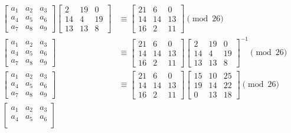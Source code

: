 \begin{Answer}
\begin{align*}
\begin{bmatrix}
      a_1 & a_2 & a_3 \\
      a_4 & a_5 & a_6 \\
      a_7 & a_8 & a_9
    \end{bmatrix} \begin{bmatrix}
         2 & 19 &  0\\
        14 &  4 & 19\\
        13 & 13 &  8
      \end{bmatrix}  &\equiv \begin{bmatrix}
      21 &  6 &  0\\
      14 & 14 & 13\\
      16 &  2 & 11 
    \end{bmatrix} \pmod{26}\\
    \begin{bmatrix}
      a_1 & a_2 & a_3 \\
      a_4 & a_5 & a_6 \\
      a_7 & a_8 & a_9
    \end{bmatrix} &\equiv \begin{bmatrix}
      21 &  6 &  0\\
      14 & 14 & 13\\
      16 &  2 & 11 
    \end{bmatrix} \begin{bmatrix}
       2 & 19 &  0\\
      14 &  4 & 19\\
      13 & 13 &  8
   \end{bmatrix}^{-1} \pmod{26}\\
   \begin{bmatrix}
    a_1 & a_2 & a_3 \\
    a_4 & a_5 & a_6 \\
    a_7 & a_8 & a_9
  \end{bmatrix} &\equiv \begin{bmatrix}
    21 &  6 &  0\\
    14 & 14 & 13\\
    16 &  2 & 11 
  \end{bmatrix} \begin{bmatrix}
   15 & 10 & 25\\
   19 & 14 & 22\\
    0 & 13 & 18
 \end{bmatrix} \pmod{26}\\
 \begin{bmatrix}
  a_1 & a_2 & a_3 \\
  a_4 & a_5 & a_6 \\

\end{bmatrix}
\end{align*}
\end{Answer}
